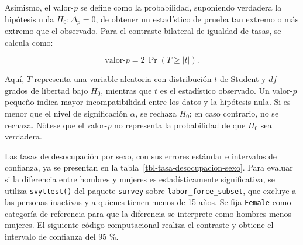 \documentclass[
  spanish,
  11pt,
  letterpaper,
  oneside,
  open=any]{scrbook}
\newenvironment{Shaded}{\begin{snugshade}}{\end{snugshade}}
\newcommand{\AttributeTok}[1]{\textcolor[rgb]{0.40,0.45,0.13}{#1}}
\newcommand{\DecValTok}[1]{\textcolor[rgb]{0.68,0.00,0.00}{#1}}
\newcommand{\FunctionTok}[1]{\textcolor[rgb]{0.28,0.35,0.67}{#1}}
\newcommand{\NormalTok}[1]{\textcolor[rgb]{0.00,0.23,0.31}{#1}}
\newcommand{\OtherTok}[1]{\textcolor[rgb]{0.00,0.23,0.31}{#1}}
\newcommand{\SpecialCharTok}[1]{\textcolor[rgb]{0.37,0.37,0.37}{#1}}
\newcommand{\StringTok}[1]{\textcolor[rgb]{0.13,0.47,0.30}{#1}}
\begin{document}
Asimismo, el valor-\emph{p} se define como la probabilidad, suponiendo
verdadera la hipótesis nula \(H_0:\Delta_p=0\), de obtener un
estadístico de prueba tan extremo o más extremo que el observado. Para
el contraste bilateral de igualdad de tasas, se calcula como:

\[
\text{valor-}p
=
2\,\Pr\!\left(T\geq |t|\right).
\]

Aquí, \(T\) representa una variable aleatoria con distribución \(t\) de
Student y \(df\) grados de libertad bajo \(H_0\), mientras que \(t\) es
el estadístico observado. Un valor-\emph{p} pequeño indica mayor
incompatibilidad entre los datos y la hipótesis nula. Si es menor que el
nivel de significación \(\alpha\), se rechaza \(H_0\); en caso
contrario, no se rechaza. Nòtese que el valor-\emph{p} no representa la
probabilidad de que \(H_0\) sea verdadera.

Las tasas de desocupación por sexo, con sus errores estándar e
intervalos de confianza, ya se presentan en la
tabla~\ref{tbl-tasa-desocupacion-sexo}. Para evaluar si la diferencia
entre hombres y mujeres es estadísticamente significativa, se utiliza
\texttt{svyttest()} del paquete \texttt{survey} sobre
\texttt{labor\_force\_subset}, que excluye a las personas inactivas y a
quienes tienen menos de 15 años. Se fija \texttt{Female} como categoría
de referencia para que la diferencia se interprete como hombres menos
mujeres. El siguiente código computacional realiza el contraste y
obtiene el intervalo de confianza del 95 \%.

\begin{Shaded}
\end{Shaded}
\end{document}
